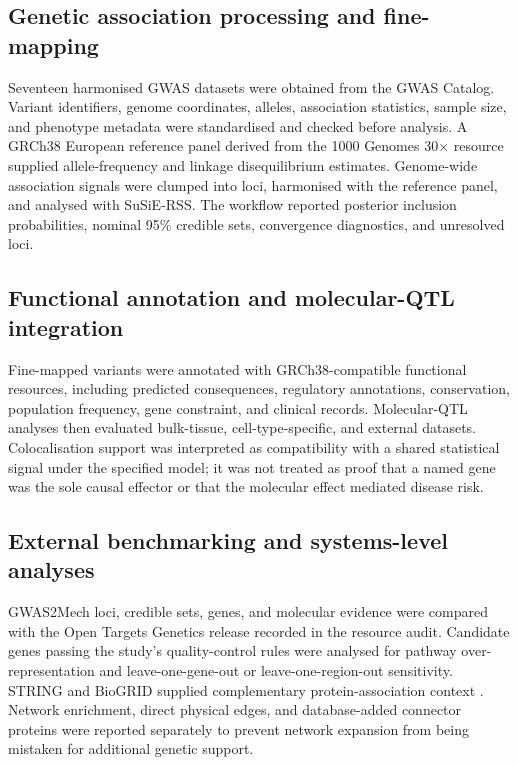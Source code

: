 \documentclass[11pt,a4paper]{article}
\begin{document}
\subsection{Genetic association processing and fine-mapping}

Seventeen harmonised GWAS datasets were obtained from the GWAS Catalog. Variant identifiers, genome coordinates, alleles, association statistics, sample size, and phenotype metadata were standardised and checked before analysis. A GRCh38 European reference panel derived from the 1000 Genomes 30$\times$ resource supplied allele-frequency and linkage disequilibrium estimates. Genome-wide association signals were clumped into loci, harmonised with the reference panel, and analysed with SuSiE-RSS. The workflow reported posterior inclusion probabilities, nominal 95\% credible sets, convergence diagnostics, and unresolved loci.

\subsection{Functional annotation and molecular-QTL integration}

Fine-mapped variants were annotated with GRCh38-compatible functional resources, including predicted consequences, regulatory annotations, conservation, population frequency, gene constraint, and clinical records. Molecular-QTL analyses then evaluated bulk-tissue, cell-type-specific, and external datasets. Colocalisation support was interpreted as compatibility with a shared statistical signal under the specified model; it was not treated as proof that a named gene was the sole causal effector or that the molecular effect mediated disease risk.

\subsection{External benchmarking and systems-level analyses}

GWAS2Mech loci, credible sets, genes, and molecular evidence were compared with the Open Targets Genetics release recorded in the resource audit. Candidate genes passing the study's quality-control rules were analysed for pathway over-representation and leave-one-gene-out or leave-one-region-out sensitivity. STRING and BioGRID supplied complementary protein-association context \cite{Szklarczyk2025STRING,Oughtred2021BioGRID}. Network enrichment, direct physical edges, and database-added connector proteins were reported separately to prevent network expansion from being mistaken for additional genetic support.
\end{document}
